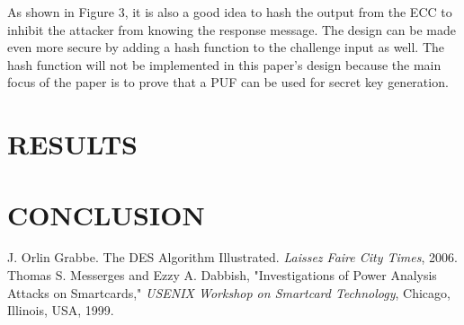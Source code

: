 \documentclass[letterpaper, 10 pt, conference]{ieeeconf}  %
\begin{document}
As shown in Figure 3, it is also a good idea to hash the output from the ECC to inhibit the attacker from knowing the response message.  The design can be made even more secure by adding a hash function to the challenge input as well.  The hash function will not be implemented in this paper's design because the main focus of the paper is to prove that a PUF can be used for secret key generation.  

\section{RESULTS}
 

\section{CONCLUSION}


\addtolength{\textheight}{-12cm}   %















\begin{thebibliography}{99}

 J. Orlin Grabbe. The DES Algorithm Illustrated. \emph{Laissez Faire City Times}, 2006.
 Thomas S. Messerges and Ezzy A. Dabbish, "Investigations of Power Analysis Attacks on Smartcards," \emph{USENIX Workshop on Smartcard Technology}, Chicago, Illinois, USA, 1999. 

\end{thebibliography}
\end{document}
